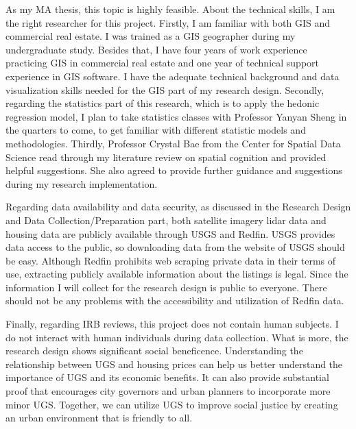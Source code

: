 
As my MA thesis, this topic is highly feasible. About the technical skills, I am the right researcher for this project. Firstly, I am familiar with both GIS and commercial real estate. I was trained as a GIS geographer during my undergraduate study. Besides that, I have four years of work experience practicing GIS in commercial real estate and one year of technical support experience in GIS software. I have the adequate technical background and data visualization skills needed for the GIS part of my research design. Secondly, regarding the statistics part of this research, which is to apply the hedonic regression model, I plan to take statistics classes with Professor Yanyan Sheng in the quarters to come, to get familiar with different statistic models and methodologies. Thirdly, Professor Crystal Bae from the Center for Spatial Data Science read through my literature review on spatial cognition and provided helpful suggestions. She also agreed to provide further guidance and suggestions during my research implementation.

Regarding data availability and data security, as discussed in the Research Design and Data Collection/Preparation part, both satellite imagery lidar data and housing data are publicly available through USGS and Redfin. USGS provides data access to the public, so downloading data from the website of USGS should be easy. Although Redfin prohibits web scraping private data in their terms of use, extracting publicly available information about the listings is legal. Since the information I will collect for the research design is public to everyone. There should not be any problems with the accessibility and utilization of Redfin data. 

Finally, regarding IRB reviews, this project does not contain human subjects. I do not interact with human individuals during data collection. What is more, the research design shows significant social beneficence. Understanding the relationship between UGS and housing prices can help us better understand the importance of UGS and its economic benefits. It can also provide substantial proof that encourages city governors and urban planners to incorporate more minor UGS. Together, we can utilize UGS to improve social justice by creating an urban environment that is friendly to all.

